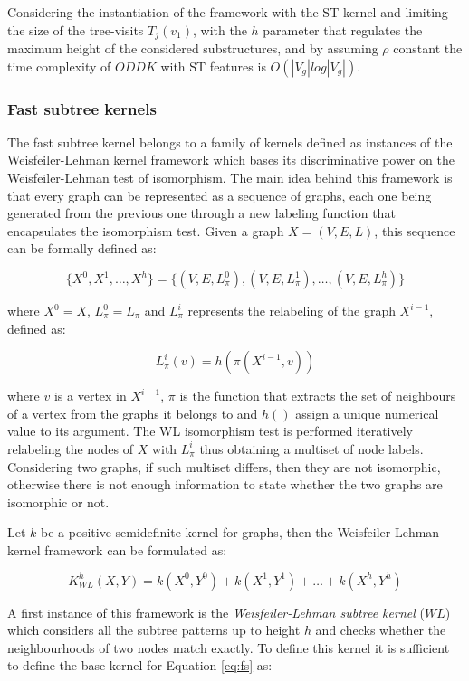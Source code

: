 Considering the instantiation of the framework with the ST kernel and limiting
the size of the tree-visits $T_j(v_1)$, with the $h$ parameter that regulates the
maximum height of the considered substructures, and by assuming $\rho$ constant
the time complexity of $ODDK$ with ST features is $O(|V_g|log|V_g|)$.

\subsubsection{Fast subtree kernels}
\label{subsubsec:fs}
The fast subtree kernel \cite{NIPS2009_3813} belongs to a family of kernels defined
as instances of the Weisfeiler-Lehman kernel framework which bases its discriminative
power on the Weisfeiler-Lehman test of isomorphism.
The main idea behind this framework is that every graph can be represented as
a sequence of graphs, each one being generated from the previous one through
a new labeling function that encapsulates the isomorphism test.
Given a graph $X = (V,E,L)$, this sequence can be formally defined as:

\[\{X^0,X^1,\dots,X^h\} = \{(V,E,L^0_\pi),(V,E,L^1_\pi),\dots,(V,E,L^h_\pi)\}\]

where $X^0 = X$, $L^0_\pi = L_\pi$ and $L^i_\pi$ represents the relabeling of the graph
$X^{i-1}$, defined as:

\[L^i_\pi(v) = h(\pi(X^{i-1},v))\]

where $v$ is a vertex in $X^{i-1}$, $\pi$ is the function that extracts the set
of neighbours of a vertex from the graphs it belongs to and $h()$ assign a unique
numerical value to its argument.
The WL isomorphism test is performed iteratively relabeling the nodes of $X$ with
$L^i_\pi$ thus obtaining a multiset of node labels. 
Considering two graphs, if such multiset differs, then they are not isomorphic,
otherwise there is not enough information to state whether the two graphs are
isomorphic or not.

Let $k$ be a positive semidefinite kernel for graphs, then the Weisfeiler-Lehman kernel
framework can be formulated as:

\begin{equation}
    K_{WL}^h(X,Y) = k(X^0,Y^0) + k(X^1,Y^1) + \dots + k(X^h,Y^h)
    \label{eq:fs}
\end{equation}

A first instance of this framework is the \emph{Weisfeiler-Lehman subtree kernel}
($WL$) which considers all the subtree patterns up to height $h$ and checks whether the
neighbourhoods of two nodes match exactly.
To define this kernel it is sufficient to define the base kernel for Equation
\ref{eq:fs} as:

